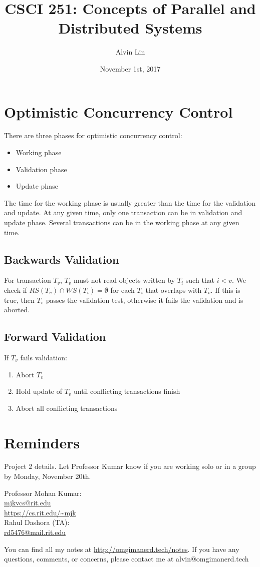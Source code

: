 \documentclass{math}
\title{CSCI 251: Concepts of Parallel and Distributed Systems}
\author{Alvin Lin}
\date{November 1st, 2017}
\begin{document}
\maketitle

\section*{Optimistic Concurrency Control}
There are three phases for optimistic concurrency control:
\begin{itemize}
  \item Working phase
  \item Validation phase
  \item Update phase
\end{itemize}
The time for the working phase is usually greater than the time for the
validation and update. At any given time, only one transaction can be in
validation and update phase. Several transactions can be in the working phase
at any given time.

\subsection*{Backwards Validation}
For transaction \( T_v \), \( T_v \) must not read objects written by \( T_i \)
such that \( i<v \). We check if \( RS(T_v)\cap WS(T_i) = \emptyset \) for each
\( T_i \) that overlaps with \( T_v \). If this is true, then \( T_v \) passes
the validation test, otherwise it fails the validation and is aborted.

\subsection*{Forward Validation}
If \( T_v \) fails validation:
\begin{enumerate}
  \item Abort \( T_v \)
  \item Hold update of \( T_v \) until conflicting transactions finish
  \item Abort all conflicting transactions
\end{enumerate}

\section*{Reminders}
Project 2 details. Let Professor Kumar know if you are working solo or in a
group by Monday, November 20th.

\noindent Professor Mohan Kumar: \\
\url{mjkvcs@rit.edu} \\
\url{https://cs.rit.edu/~mjk} \\

\noindent Rahul Dashora (TA): \\
\url{rd5476@mail.rit.edu} \\

\begin{center}
  You can find all my notes at \url{http://omgimanerd.tech/notes}. If you have
  any questions, comments, or concerns, please contact me at
  alvin@omgimanerd.tech
\end{center}
\end{document}
